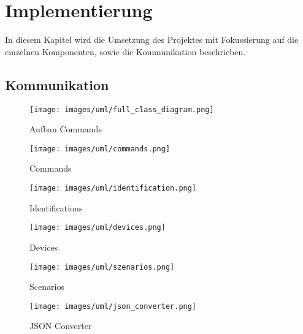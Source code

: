 \section{Implementierung}

In diesem Kapitel wird die Umsetzung des Projektes mit Fokussierung auf die einzelnen Komponenten, sowie die Kommunikation beschrieben.

\subsection{Kommunikation}

\begin{figure}[h]
	\begin{center}
		\texttt{[image: images/uml/full\_class\_diagram.png]}
	\end{center}
	\caption{Aufbau Commands}
	\label{fig:full_classdiagram}
\end{figure}

\begin{figure}[h]
	\begin{center}
		\texttt{[image: images/uml/commands.png]}
	\end{center}
	\caption{Commands}
	\label{fig:commands_classdiagram}
\end{figure}

\begin{figure}[h]
	\begin{center}
		\texttt{[image: images/uml/identification.png]}
	\end{center}
	\caption{Identifications}
	\label{fig:identification_classdiagram}
\end{figure}

\begin{figure}[h]
	\begin{center}
		\texttt{[image: images/uml/devices.png]}
	\end{center}
	\caption{Devices}
	\label{fig:devices_classdiagram}
\end{figure}

\begin{figure}[h]
	\begin{center}
		\texttt{[image: images/uml/szenarios.png]}
	\end{center}
	\caption{Scenarios}
	\label{fig:szenarios_classdiagram}
\end{figure}

\begin{figure}[h]
	\begin{center}
		\texttt{[image: images/uml/json\_converter.png]}
	\end{center}
	\caption{JSON Converter}
	\label{fig:converter_classdiagram}
\end{figure}

